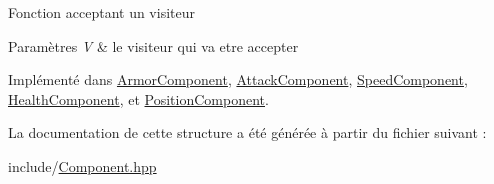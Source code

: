 Fonction acceptant un visiteur


\begin{DoxyParams}{Paramètres}
{\em V} & le visiteur qui va etre accepter \\
\hline
\end{DoxyParams}


Implémenté dans \hyperlink{structArmorComponent_aac5863d4195fe056fbb0a2a0af17b6e0}{Armor\+Component}, \hyperlink{structAttackComponent_a6644fff9ad3be5bc7cd9571f811fe25e}{Attack\+Component}, \hyperlink{structSpeedComponent_a6857d2108ab631e63a9040bf77a8b366}{Speed\+Component}, \hyperlink{structHealthComponent_a47bb95e02765b03a387366b866046860}{Health\+Component}, et \hyperlink{structPositionComponent_a7f5ef56cf9e5722c7df9fdfa66fdf425}{Position\+Component}.



La documentation de cette structure a été générée à partir du fichier suivant \+:\begin{DoxyCompactItemize}
\item 
include/\hyperlink{Component_8hpp}{Component.\+hpp}\end{DoxyCompactItemize}
